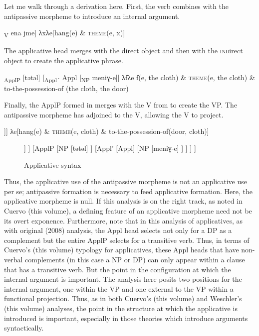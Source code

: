 \documentclass[output=paper,modfonts,nonflat,newtxmath]{langsci/langscibook}
\begin{document}
Let me walk through a derivation here. First, the verb combines with the antipassive morpheme to introduce an internal argument.

\ea%
    \label{ex:basilico:7}
    \ea {[}\textsubscript{V} ena jme{]} 
    \ex λxλe[hang(e) \& \textsc{theme}(e, x)]  
    \z
    \z

            

The applicative head merges with the direct object and then with the \textsc{ind}irect object to create the applicative phrase.

\ea%
    \label{ex:basilico:8}
    	\ea {[}\textsubscript{ApplP} [tǝtǝl] [\textsubscript{Appl´} Appl [\textsubscript{NP} meniɣ-e]{]}  
    \ex λfλe f(e, the cloth) \& \textsc{theme}(e, the cloth) \& to-the-possession-of (the cloth, the door)
    \z
    \z
 
Finally, the ApplP formed in  merges with the V from  to create the VP. The antipassive morpheme has adjoined to the V, allowing the V to project.

\ea%
    \label{ex:basilico:9}
    	\ea [\textsubscript{VP} [\textsubscript{V} ena jme] [\textsubscript{ApplP} [tǝtǝl] [\textsubscript{Appl´} Appl [\textsubscript{NP} meniɣ-e]]]
    \ex λe[hang(e) \& \textsc{theme}(e, cloth) \& to-the-possession-of(door, cloth)]
    \z
    \z
    
\begin{figure}
	\begin{forest}
	[VP
		[V
			[ena]
			[V
				[jme]
			]
		]
		[ApplP
			[NP
				[tǝtǝl]
			]
			[Appl'
				[Appl]
				[NP
					[meniɣ-e]
				]
			]
		]
	]	
	\end{forest}	
		\caption{\label{fig:basilico:9} Applicative syntax}
\end{figure}                                       

Thus, the applicative use of the antipassive morpheme is not an applicative use per se; antipassive formation is necessary to feed applicative formation. Here, the applicative morpheme is null. If this analysis is on the right track, as noted in Cuervo (this volume),  a defining feature of an applicative morpheme need not be its overt exponence. Furthermore, note that in this analysis of applicatives, as with \citep{Pyllkänen2008} original (2008) analysis, the Appl head selects not only for a DP as a complement but the entire ApplP selects for a transitive verb. Thus, in terms of Cuervo’s (this volume) typology for applicatives, these Appl heads that have non-verbal complements (in this case a NP or DP) can only appear within a clause that has a transitive verb. But the point in the configuration at which the internal argument is important. The analysis here posits two positions for the internal argument, one within the VP and one external to the VP within a functional projection. Thus, as in both Cuervo’s (this volume) and Weschler’s (this volume) analyses, the point in the structure at which the applicative is introduced is important, especially in those theories which introduce arguments syntactically. 
\end{document}
